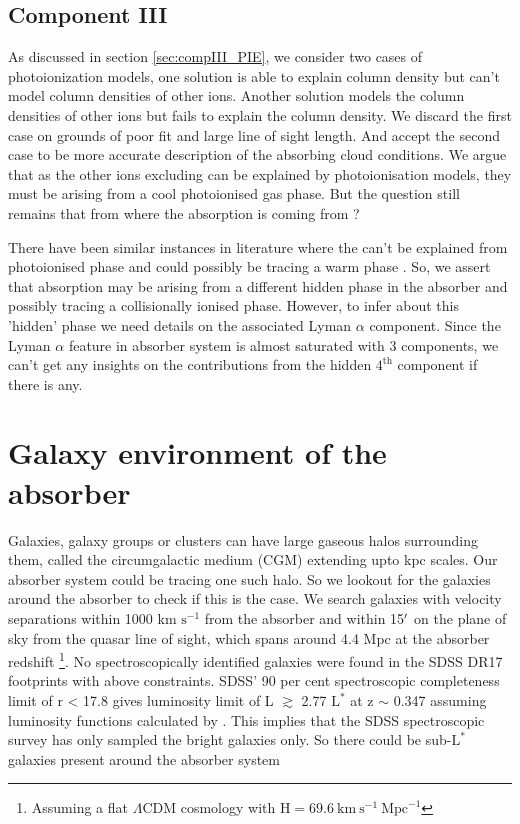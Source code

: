 \subsection{Component III}

As discussed in section \ref{sec:compIII_PIE}, we consider two cases of photoionization models, one solution is able to explain  column density but can't model column densities of other ions. Another solution models the column densities of other ions but fails to explain the  column density. We discard the first case on grounds of poor fit and large line of sight length. And accept the second case to be more accurate description of the absorbing cloud conditions. We argue that as the other ions excluding  can be explained by photoionisation models, they must be arising from a cool photoionised gas phase. But the question still remains that from where the  absorption is coming from ?  

There have been similar instances in literature where the  can't be explained from photoionised phase and could possibly be tracing a warm phase \citep[see e.g.][]{Pradeep-2020,Anshul-2021}. So,
we assert that  absorption may be arising from a different hidden phase in the absorber and possibly tracing a collisionally ionised phase. However, to infer about this 'hidden' phase we need details on the associated Lyman $\alpha$ component. Since the Lyman $\alpha$ feature in absorber system is almost saturated with 3 components, we can't get any insights on the contributions from the hidden $\text{4}^{\text{th}}$ component if there is any.

\section{Galaxy environment of the absorber}

Galaxies, galaxy groups or clusters can have large gaseous halos surrounding them, called the circumgalactic medium (CGM) extending upto kpc scales. Our absorber system could be tracing one such halo. So we lookout for the galaxies around the absorber to check if this is the case. We search galaxies with velocity separations within 1000 km $\text{s}^{-1}$ from the absorber and within 15$\hbox{$^\prime$}$ on the plane of sky from the quasar line of sight, which spans around 4.4 Mpc at the absorber redshift \footnote{Assuming a flat $\Lambda$CDM cosmology with $\text{H}=69.6 \ \text{km} \ \text{s}^{-1} \ \text{Mpc}^{-1}$}. No spectroscopically identified galaxies were found in the SDSS DR17 \citep{SDSS_DR17} footprints with above constraints.  SDSS' 90 per cent spectroscopic completeness limit of r < 17.8 \citep{strauss_SDSS} gives luminosity limit of L $\gtrsim$ 2.77 $\text{L}^{*}$ at z $\sim$ 0.347 assuming luminosity functions calculated by \citet{ilbert_GLF}. This implies that the SDSS spectroscopic survey has only sampled the bright galaxies only. So there could be sub-$\text{L}^{*}$ galaxies present around the absorber system

